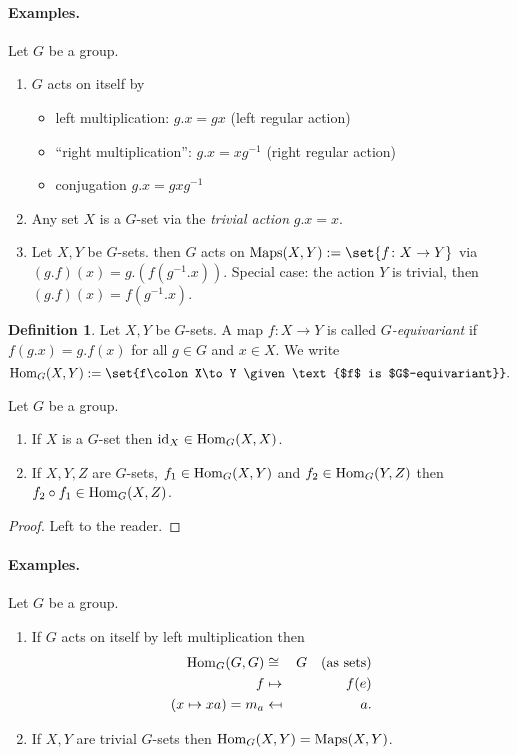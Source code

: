 \documentclass[12pt,a4paper]{scrartcl}
\theoremstyle{cplain}
\theoremstyle{cplain}
\theoremstyle{cplain}
\theoremstyle{definition}
\newtheorem*{deff}{Definition}
\begin{document}
\begin{otherlanguage}{english}
\paragraph{Examples.}
Let $G$ be a group.
\begin{enumerate}
  \item $G$ acts on itself by
  \begin{itemize}
    \item left multiplication: $g.x = gx$ (left regular action)
    \item \enquote{right multiplication}: $g.x = xg^{-1}$ (right regular action)
    \item conjugation $g.x = gxg^{-1}$
  \end{itemize}
  \item Any set $X$ is a $G$-set via the \emph{trivial action} $g.x = x$.
  \item Let $X,Y$ be $G$-sets. then $G$ acts on $\Maps(X,Y) := \set{f\colon X\to Y}$ via $(g.f)(x) = g.(f(g^{-1}.x))$. Special case: the action $Y$ is trivial, then $(g.f)(x) = f(g^{-1}.x)$.
\end{enumerate}

\begin{deff}
  Let $X,Y$ be $G$-sets. A map $f\colon X\to Y$ is called \emph{$G$-equivariant} if $f(g.x) = g.f(x)$ for all $g\in G$ and $x \in X$. We write \[\Hom_G(X,Y) := \set{f\colon X\to Y \given \text{$f$ is $G$-equivariant}}.\]
\end{deff}
\begin{lem}
  Let $G$ be a group.
  \begin{enumerate}
    \item If $X$ is a $G$-set then $\operatorname{id}_X\in \operatorname{Hom}_G(X,X)$.
    \item If $X,Y,Z$ are $G$-sets, $f_1 \in \operatorname{Hom}_G(X,Y)$ and $f_2 \in \operatorname{Hom}_G(Y,Z)$ then $f_2 \circ f_1 \in \operatorname{Hom}_G(X,Z)$.
  \end{enumerate}
\end{lem}
\begin{proof}
  Left to the reader.
\end{proof}

\paragraph{Examples.}
Let $G$ be a group.
\begin{enumerate}
  \item If $G$ acts on itself by left multiplication then
  \begin{eqnarray*}
    \operatorname{Hom}_G(G,G) &\cong& G \quad\text{(as sets)} \\
    f &\mapsto& f(e) \\
    (x\mapsto xa) = m_a &\mapsfrom& a.
  \end{eqnarray*}
  \item If $X,Y$ are trivial $G$-sets then $\operatorname{Hom}_G(X,Y) = \operatorname{Maps}(X,Y)$.
\end{enumerate}


\end{otherlanguage}
\end{document}
